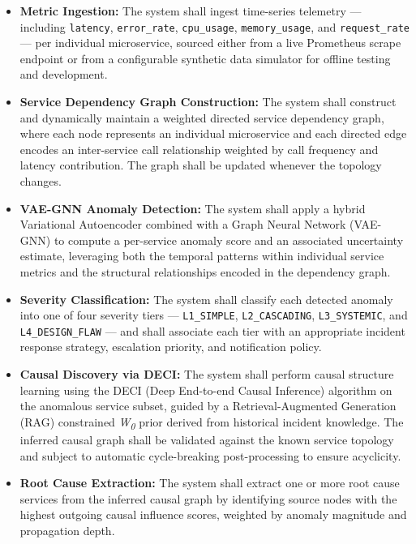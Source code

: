 \begin{itemize}

    \item \textbf{Metric Ingestion:} The system shall ingest time-series telemetry — including \texttt{latency}, \texttt{error\_rate}, \texttt{cpu\_usage}, \texttt{memory\_usage}, and \texttt{request\_rate} — per individual microservice, sourced either from a live Prometheus scrape endpoint or from a configurable synthetic data simulator for offline testing and development.

    \item \textbf{Service Dependency Graph Construction:} The system shall construct and dynamically maintain a weighted directed service dependency graph, where each node represents an individual microservice and each directed edge encodes an inter-service call relationship weighted by call frequency and latency contribution. The graph shall be updated whenever the topology changes.

    \item \textbf{VAE-GNN Anomaly Detection:} The system shall apply a hybrid Variational Autoencoder combined with a Graph Neural Network (VAE-GNN) to compute a per-service anomaly score and an associated uncertainty estimate, leveraging both the temporal patterns within individual service metrics and the structural relationships encoded in the dependency graph.

    \item \textbf{Severity Classification:} The system shall classify each detected anomaly into one of four severity tiers — \texttt{L1\_SIMPLE}, \texttt{L2\_CASCADING}, \texttt{L3\_SYSTEMIC}, and \texttt{L4\_DESIGN\_FLAW} — and shall associate each tier with an appropriate incident response strategy, escalation priority, and notification policy.

    \item \textbf{Causal Discovery via DECI:} The system shall perform causal structure learning using the DECI (Deep End-to-end Causal Inference) algorithm on the anomalous service subset, guided by a Retrieval-Augmented Generation (RAG) constrained \textit{W\textsubscript{0}} prior derived from historical incident knowledge. The inferred causal graph shall be validated against the known service topology and subject to automatic cycle-breaking post-processing to ensure acyclicity.

    \item \textbf{Root Cause Extraction:} The system shall extract one or more root cause services from the inferred causal graph by identifying source nodes with the highest outgoing causal influence scores, weighted by anomaly magnitude and propagation depth.


\end{itemize}
